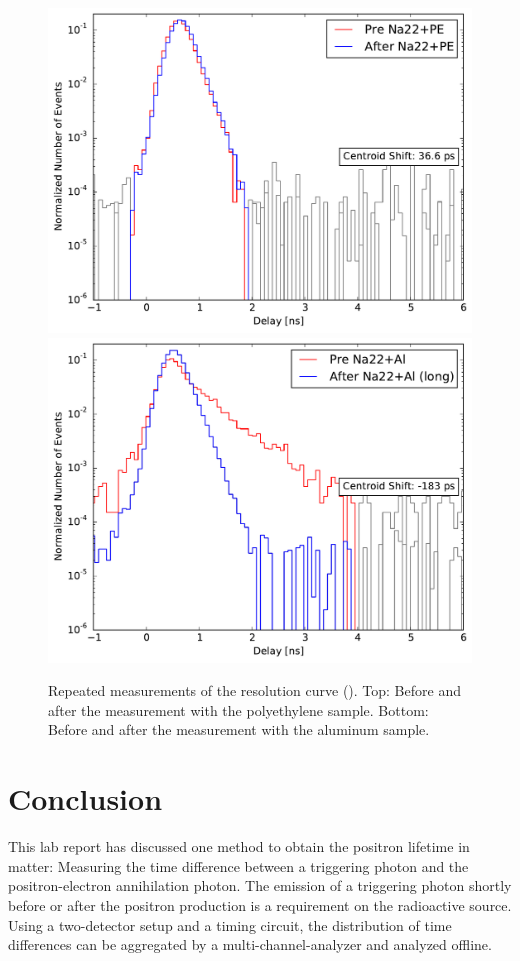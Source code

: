 \documentclass[
	paper=A4,
	parskip=full,
	chapterprefix=true,
	11pt,
	headings=normal,
	bibliography=totoc,
	listof=totoc,
	titlepage=on,
]{scrreprt}
\begin{document}
\begin{figure}
	\centering
	\includegraphics[width=1\textwidth]{all_cobalt_1}
	\includegraphics[width=1\textwidth]{all_cobalt_0}
	\caption{Repeated measurements of the resolution curve (). Top: Before and after the measurement with the polyethylene sample. Bottom: Before and after the measurement with the aluminum sample.}
	\label{fig:instability}
\end{figure}

\chapter{Conclusion}
This lab report has discussed one method to obtain the positron lifetime in matter: Measuring the time difference between a triggering photon and the positron-electron annihilation photon. The emission of a triggering photon shortly before or after the positron production is a requirement on the radioactive source. Using a two-detector setup and a timing circuit, the distribution of time differences can be aggregated by a multi-channel-analyzer and analyzed offline.
\end{document}
